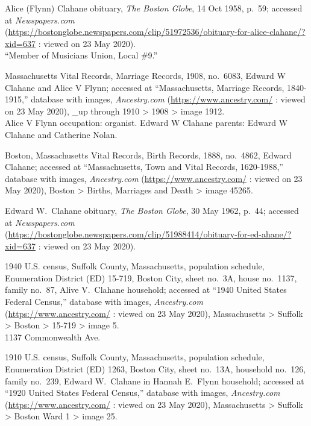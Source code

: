 \begin{thebibliography}{999}
	Alice (Flynn) Clahane obituary, \textit{The Boston Globe}, 14 Oct 1958, p.\ 59; accessed at \textit{Newspapers.com} (\url{https://bostonglobe.newspapers.com/clip/51972536/obituary-for-alice-clahane/?xid=637} : viewed on 23 May 2020).\\
	``Member of Musicians Union, Local \#9.''
	
	Massachusetts Vital Records, Marriage Records, 1908, no.\ 6083, Edward W Clahane and Alice V Flynn; accessed at ``Massachusetts, Marriage Records, 1840-1915,'' database with images, \textit{Ancestry.com} (\url{https://www.ancestry.com/} : viewed on 23 May 2020), \_up through 1910 > 1908 > image 1912.\\
	Alice V Flynn occupation: organist. Edward W Clahane parents: Edward W Clahane and Catherine Nolan.
	
	Boston, Massachusetts Vital Records, Birth Records, 1888, no.\ 4862, Edward Clahane; accessed at ``Massachusetts, Town and Vital Records, 1620-1988,'' database with images, \textit{Ancestry.com} (\url{https://www.ancestry.com/} : viewed on 23 May 2020), Boston > Births, Marriages and Death > image 45265.
	
	Edward W.\ Clahane obituary, \textit{The Boston Globe}, 30 May 1962, p.\ 44; accessed at \textit{Newspapers.com} (\url{https://bostonglobe.newspapers.com/clip/51988414/obituary-for-ed-ahane/?xid=637} : viewed on 23 May 2020).
	
	1940 U.S. census, Suffolk County, Massachusetts, population schedule, Enumeration District (ED) 15-719, Boston City, sheet no.\ 3A, house no.\ 1137, family no.\ 87, Alive V.\ Clahane household; accessed at ``1940 United States Federal Census,'' database with images, \textit{Ancestry.com} (\url{https://www.ancestry.com/} : viewed on 23 May 2020), Massachusetts > Suffolk > Boston > 15-719 > image 5.\\
	1137 Commonwealth Ave.
	
	1910 U.S. census, Suffolk County, Massachusetts, population schedule, Enumeration District (ED) 1263, Boston City, sheet no.\ 13A, household no.\ 126, family no.\ 239, Edward W.\ Clahane in Hannah E.\ Flynn household; accessed at ``1920 United States Federal Census,'' database with images, \textit{Ancestry.com} (\url{https://www.ancestry.com/} : viewed on 23 May 2020), Massachusetts > Suffolk > Boston Ward 1 > image 25.
	

\end{thebibliography}
